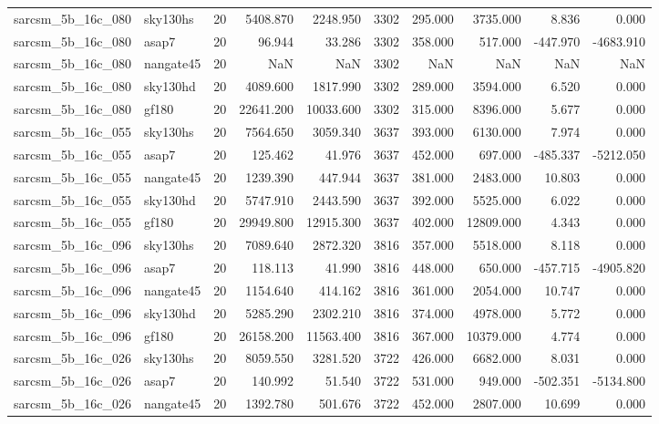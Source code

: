 \begin{tabular}{llrrrrrrrr}
sarcsm\_5b\_16c\_080 & sky130hs & 20 & 5408.870 & 2248.950 & 3302 & 295.000 & 3735.000 & 8.836 & 0.000 \\
sarcsm\_5b\_16c\_080 & asap7 & 20 & 96.944 & 33.286 & 3302 & 358.000 & 517.000 & -447.970 & -4683.910 \\
sarcsm\_5b\_16c\_080 & nangate45 & 20 & NaN & NaN & 3302 & NaN & NaN & NaN & NaN \\
sarcsm\_5b\_16c\_080 & sky130hd & 20 & 4089.600 & 1817.990 & 3302 & 289.000 & 3594.000 & 6.520 & 0.000 \\
sarcsm\_5b\_16c\_080 & gf180 & 20 & 22641.200 & 10033.600 & 3302 & 315.000 & 8396.000 & 5.677 & 0.000 \\
sarcsm\_5b\_16c\_055 & sky130hs & 20 & 7564.650 & 3059.340 & 3637 & 393.000 & 6130.000 & 7.974 & 0.000 \\
sarcsm\_5b\_16c\_055 & asap7 & 20 & 125.462 & 41.976 & 3637 & 452.000 & 697.000 & -485.337 & -5212.050 \\
sarcsm\_5b\_16c\_055 & nangate45 & 20 & 1239.390 & 447.944 & 3637 & 381.000 & 2483.000 & 10.803 & 0.000 \\
sarcsm\_5b\_16c\_055 & sky130hd & 20 & 5747.910 & 2443.590 & 3637 & 392.000 & 5525.000 & 6.022 & 0.000 \\
sarcsm\_5b\_16c\_055 & gf180 & 20 & 29949.800 & 12915.300 & 3637 & 402.000 & 12809.000 & 4.343 & 0.000 \\
sarcsm\_5b\_16c\_096 & sky130hs & 20 & 7089.640 & 2872.320 & 3816 & 357.000 & 5518.000 & 8.118 & 0.000 \\
sarcsm\_5b\_16c\_096 & asap7 & 20 & 118.113 & 41.990 & 3816 & 448.000 & 650.000 & -457.715 & -4905.820 \\
sarcsm\_5b\_16c\_096 & nangate45 & 20 & 1154.640 & 414.162 & 3816 & 361.000 & 2054.000 & 10.747 & 0.000 \\
sarcsm\_5b\_16c\_096 & sky130hd & 20 & 5285.290 & 2302.210 & 3816 & 374.000 & 4978.000 & 5.772 & 0.000 \\
sarcsm\_5b\_16c\_096 & gf180 & 20 & 26158.200 & 11563.400 & 3816 & 367.000 & 10379.000 & 4.774 & 0.000 \\
sarcsm\_5b\_16c\_026 & sky130hs & 20 & 8059.550 & 3281.520 & 3722 & 426.000 & 6682.000 & 8.031 & 0.000 \\
sarcsm\_5b\_16c\_026 & asap7 & 20 & 140.992 & 51.540 & 3722 & 531.000 & 949.000 & -502.351 & -5134.800 \\
sarcsm\_5b\_16c\_026 & nangate45 & 20 & 1392.780 & 501.676 & 3722 & 452.000 & 2807.000 & 10.699 & 0.000 \\

\end{tabular}
